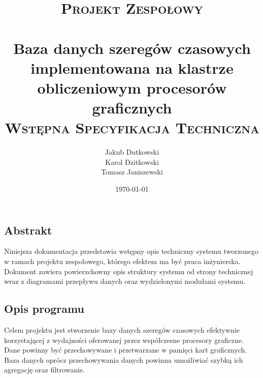 \documentclass[paper=a4, fontsize=11pt]{scrartcl} %
\title{
\vspace*{\fill}
\normalfont
\textsc{Projekt Zespołowy}\\ [20pt]
\horrule{1.5pt} \\[0.4cm] %
\LARGE Baza danych szeregów czasowych implementowana na klastrze obliczeniowym procesorów graficznych
\horrule{1.5pt} \\[0.1cm] %
\normalsize
\textsc{Wstępna Specyfikacja Techniczna} \\ [20pt]
\vspace*{\fill}
}
\author{Jakub Dutkowski \\ Karol Dzitkowski \\ Tomasz Janiszewski } %
\date{\normalsize\today} %
\numberwithin{equation}{section} %
\numberwithin{figure}{section} %
\numberwithin{table}{section} %
\begin{document}
\maketitle

\thispagestyle{empty}
\clearpage

\tableofcontents
\listoffigures

\chapter{}

\clearpage

\vspace{4em}


\section{Abstrakt}
Niniejsza dokumentacja przedstawia wstępny opis techniczny systemu tworzonego w ramach projektu zespołowego, którego efektem ma być praca inżynierska.
Dokument zawiera powierzchowny opis struktury systemu od strony technicznej wraz z diagramami przepływu danych oraz wydzielonymi modułami systemu.

\section{Opis programu}
Celem projektu jest stworzenie bazy danych szeregów czasowych efektywnie korzystającej z wydajności oferowanej przez współczesne
procesory graficzne. Dane powinny być przechowywane i przetwarzane w pamięci kart graficznych. Baza danych oprócz przechowywania
danych powinna umożliwiać szybką ich agregację oraz filtrowanie.
\end{document}
